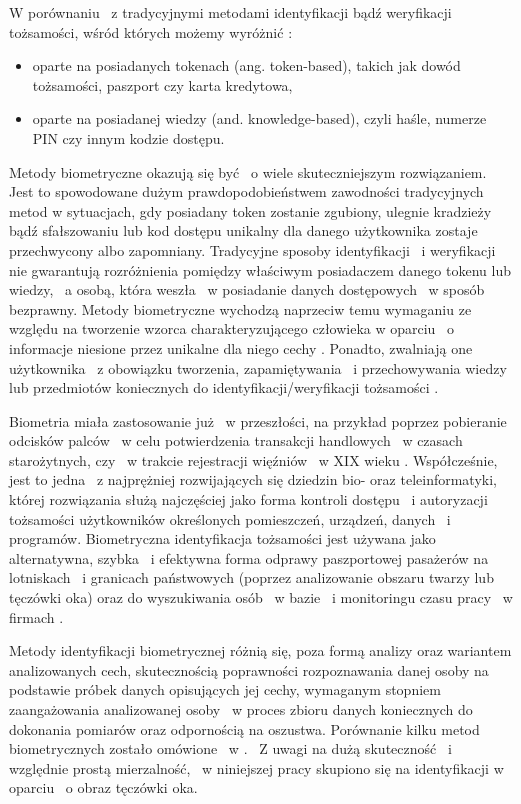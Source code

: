 W porównaniu ~z tradycyjnymi metodami identyfikacji bądź weryfikacji tożsamości, wśród których możemy wyróżnić \cite{Jain00}\cite{Jain08}:
\begin{itemize}
\item oparte na posiadanych tokenach (ang. token-based), takich jak dowód tożsamości, paszport czy karta kredytowa,
\item oparte na posiadanej wiedzy (and. knowledge-based), czyli haśle, numerze PIN czy innym kodzie dostępu.
\end{itemize}
Metody biometryczne okazują się być ~o wiele skuteczniejszym rozwiązaniem. Jest to spowodowane dużym prawdopodobieństwem zawodności tradycyjnych metod w sytuacjach, gdy posiadany token zostanie zgubiony, ulegnie kradzieży bądź sfałszowaniu lub kod dostępu unikalny dla danego użytkownika zostaje przechwycony albo zapomniany. Tradycyjne sposoby identyfikacji ~i weryfikacji nie gwarantują rozróżnienia pomiędzy właściwym posiadaczem danego tokenu lub wiedzy, ~a osobą, która weszła ~w posiadanie danych dostępowych ~w sposób bezprawny. Metody biometryczne wychodzą naprzeciw temu wymaganiu ze względu na tworzenie wzorca charakteryzującego człowieka w oparciu ~o informacje niesione przez unikalne dla niego cechy \cite{Jain00}. Ponadto, zwalniają one użytkownika ~z obowiązku tworzenia, zapamiętywania ~i przechowywania wiedzy lub przedmiotów koniecznych do identyfikacji/weryfikacji tożsamości \cite{Jain08}.  

Biometria miała zastosowanie już ~w przeszłości, na przykład poprzez pobieranie odcisków palców ~w celu potwierdzenia transakcji handlowych ~w czasach starożytnych, czy ~w trakcie rejestracji więźniów ~w XIX wieku \cite{Bio02}\cite{HF1}. Współcześnie, jest to jedna ~z najprężniej rozwijających się dziedzin bio- oraz teleinformatyki, której rozwiązania służą najczęściej jako forma kontroli dostępu ~i autoryzacji tożsamości użytkowników określonych pomieszczeń, urządzeń, danych ~i programów. Biometryczna identyfikacja tożsamości jest używana jako alternatywna, szybka ~i efektywna forma odprawy paszportowej pasażerów na lotniskach ~i granicach państwowych (poprzez analizowanie obszaru twarzy lub tęczówki oka) oraz do wyszukiwania osób ~w bazie ~i monitoringu czasu pracy ~w firmach \cite{Bio01}\cite{Bio02}.

Metody identyfikacji biometrycznej różnią się, poza formą analizy oraz wariantem analizowanych cech, skutecznością poprawności rozpoznawania danej osoby na podstawie próbek danych opisujących jej cechy, wymaganym stopniem zaangażowania analizowanej osoby ~w proces zbioru danych koniecznych do dokonania pomiarów oraz odpornością na oszustwa. Porównanie kilku metod biometrycznych zostało omówione ~w \cite{Gl11}. ~Z uwagi na dużą skuteczność ~i względnie prostą mierzalność, ~w niniejszej pracy skupiono się na identyfikacji w oparciu ~o obraz tęczówki oka.


